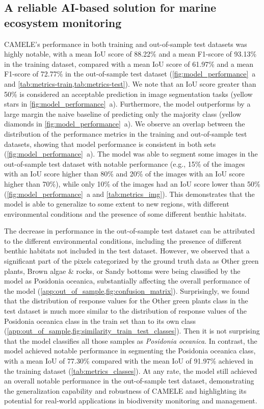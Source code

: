 \subsection{A reliable AI-based solution for marine ecosystem monitoring}

CAMELE's performance in both training and out-of-sample test datasets was
highly notable, with a mean IoU score of 88.22\% and a mean F1-score of
93.13\% in the training dataset, compared with a mean IoU score of 61.97\%
and a mean F1-score of 72.77\% in the out-of-sample test dataset
(\cref{fig:model_performance}~\textcolor{ref_color}{a} and
\cref{tab:metrics-train,tab:metrics-test}).
We note that an IoU score greater than 50\% is considered an acceptable
prediction in image segmentation tasks \cite{dai2016instance} (yellow stars in
\cref{fig:model_performance}~\textcolor{ref_color}{a}). Furthermore, the model
outperforms by a large
margin the naive baseline of predicting only the majority class (yellow
diamonds in \cref{fig:model_performance}~\textcolor{ref_color}{a}). We observe
an overlap between the
distribution of the performance metrics in the training and out-of-sample test
datasets, showing that model performance is consistent in both sets
(\cref{fig:model_performance}~\textcolor{ref_color}{a}). The model was able to
segment some images in
the out-of-sample test dataset with notable performance (e.g., 15\% of the
images with an IoU score higher than 80\% and 20\% of the images with an IoU
score higher than 70\%), while only 10\% of the images had an IoU score lower
than 50\% (\cref{fig:model_performance}~\textcolor{ref_color}{a} and
\cref{tab:metrics_img}). This
demonstrates that the model is able to generalize to some extent to new
regions, with different environmental conditions and the presence of some
different benthic habitats.

The decrease in performance in the out-of-sample test dataset can be
attributed to the different environmental conditions, including the
presence of different benthic habitats not included in the test dataset.
However, we observed that a significant part of the pixels categorized by
the ground truth data as Other green plants, Brown algae \& rocks, or Sandy
bottoms were being classified by the model as Posidonia oceanica, substantially
affecting the overall performance of the model
(\cref{app:out_of_sample,fig:confusion_matrix}).
Surprisingly, we found that the distribution of response values for the Other
green plants class in the test dataset is much more similar to the distribution
of response values of the Posidonia oceanica class in the train set
than to its own class
(\cref{app:out_of_sample,fig:similarity_train_test_classes}). Then it is not
surprising that the model classifies all those samples as \textit{Posidonia
    oceanica}. In contrast, the model achieved notable performance in
segmenting the Posidonia oceanica class, with a mean IoU of 77.30\% compared
with the mean IoU of 91.97\% achieved in the training dataset
(\cref{tab:metrics_classes}). At any rate, the model still achieved an overall
notable performance in the out-of-sample test dataset, demonstrating the
generalization capability and robustness of CAMELE and highlighting its
potential for real-world applications in biodiversity monitoring and
management.

